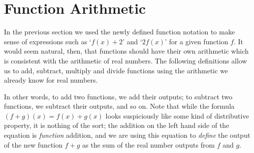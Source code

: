 \section{Function Arithmetic}
\label{FunctionArithmetic}

In the previous section we used the newly defined function notation to make sense of expressions such as `$f(x) + 2$' and `$2f(x)$' for a given function $f$.  It would seem natural, then, that functions should have their own arithmetic which is consistent with the arithmetic of real numbers.  The following definitions allow us to add, subtract, multiply and divide functions using the arithmetic we already know for real numbers.

\medskip


\medskip

In other words, to add two functions, we add their outputs;  to subtract two functions, we subtract their outputs, and so on.  Note that while the formula $(f+g)(x) = f(x) + g(x)$ looks suspiciously like some kind of distributive property, it is nothing of the sort;  the addition on the left hand side of the equation is \textit{function} addition, and we are using this equation to \textit{define} the output of the new function $f+g$ as the sum of the real number outputs from $f$ and $g$.

